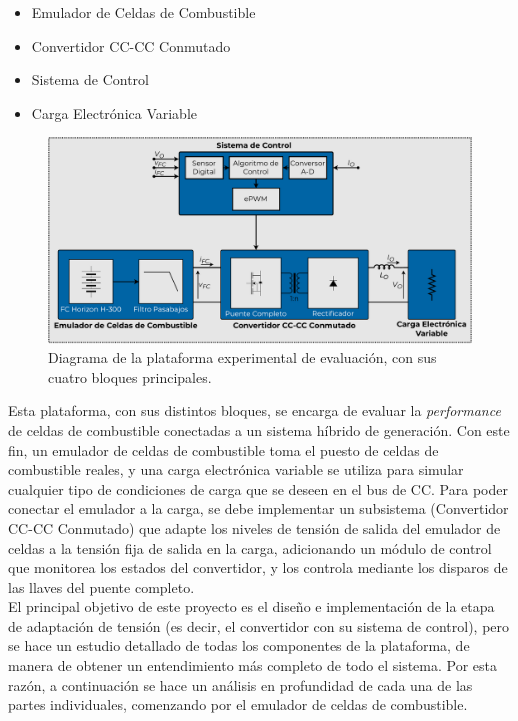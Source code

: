 \begin{itemize}
    \Medium \item Emulador de Celdas de Combustible
    \Medium \item Convertidor CC-CC Conmutado
    \Medium \item Sistema de Control
    \Medium \item Carga Electrónica Variable\\
\end{itemize}

\begin{figure}[h]
    \centering
    \includegraphics[scale=0.4]{Imagenes/Plataforma Experimental.pdf}
    \caption{Diagrama de la plataforma experimental de evaluación, con sus cuatro bloques principales.}
    \label{diag_plataforma}
\end{figure}

Esta plataforma, con sus distintos bloques, se encarga de evaluar la \textit{performance} de celdas de combustible conectadas a un sistema híbrido de generación. Con este fin, un emulador de celdas de combustible toma el puesto de celdas de combustible reales, y una carga electrónica variable se utiliza para simular cualquier tipo de condiciones de carga que se deseen en el bus de CC. Para poder conectar el emulador a la carga, se debe implementar un subsistema (Convertidor CC-CC Conmutado) que adapte los niveles de tensión de salida del emulador de celdas a la tensión fija de salida en la carga, adicionando un módulo de control que monitorea los estados del convertidor, y los controla mediante los disparos de las llaves del puente completo.\\

El principal objetivo de este proyecto es el diseño e implementación de la etapa de adaptación de tensión (es decir, el convertidor con su sistema de control), pero se hace un estudio detallado de todas los componentes de la plataforma, de manera de obtener un entendimiento más completo de todo el sistema. Por esta razón, a continuación se hace un análisis en profundidad de cada una de las partes individuales, comenzando por el emulador de celdas de combustible.\\


